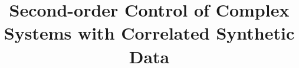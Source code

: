 \documentclass{bmcart}
\begin{document}
\begin{frontmatter}

\begin{fmbox}

\title{Second-order Control of Complex Systems with Correlated Synthetic Data}

\author[
   addressref={aff1,aff2,aff3},                   %
   corref={aff1},                       %
   email={juste.raimbault@polytechnique.edu}   %
]{ }

\address[id=aff1]{%
  , %
  ,                              %
}
\address[id=aff2]{%
  ,
  ,
}
\address[id=aff3]{%
  ,
  ,
}

\end{fmbox}







\begin{abstractbox}


\end{abstractbox}
\end{frontmatter}
\end{document}
